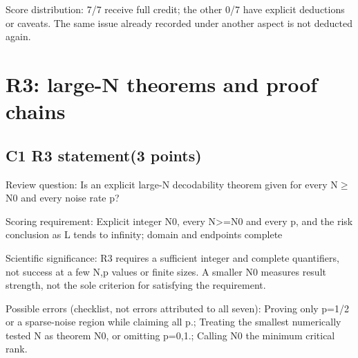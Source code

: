 \documentclass[11pt,a4paper]{article}
\begin{document}
Score distribution: 7/\allowbreak{}7 receive full credit; the other 0/\allowbreak{}7 have explicit deductions or caveats. The same issue already recorded under another aspect is not deducted again.

\clearpage
\section{R3: large-N theorems and proof chains}
\subsection{C1 R3 statement(3 points)}
\label{aspect:C1}
Review question: Is an explicit large-N decodability theorem given for every N\ensuremath{\geq}N0 and every noise rate p?

Scoring requirement: Explicit integer N0,\allowbreak{} every N>=N0 and every p,\allowbreak{} and the risk conclusion as L tends to infinity; domain and endpoints complete

Scientific significance: R3 requires a sufficient integer and complete quantifiers,\allowbreak{} not success at a few N,\allowbreak{}p values or finite sizes. A smaller N0 measures result strength,\allowbreak{} not the sole criterion for satisfying the requirement.

Possible errors (checklist,\allowbreak{} not errors attributed to all seven): Proving only p=1/\allowbreak{}2 or a sparse-noise region while claiming all p.; Treating the smallest numerically tested N as theorem N0,\allowbreak{} or omitting p=0,\allowbreak{}1.; Calling N0 the minimum critical rank.
\end{document}
